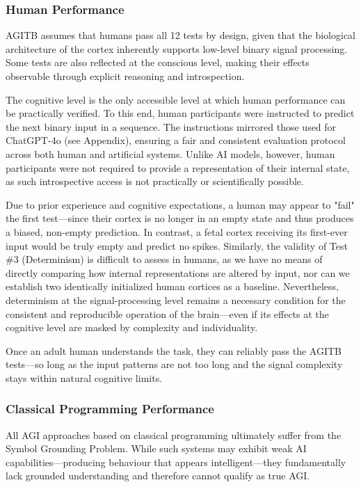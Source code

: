\documentclass{article}
\begin{document}
\subsubsection{Human Performance}

AGITB assumes that humans pass all 12 tests by design, given that the biological architecture of the cortex inherently supports low-level binary signal processing. Some tests are also reflected at the conscious level, making their effects observable through explicit reasoning and introspection.

The cognitive level is the only accessible level at which human performance can be practically verified. To this end, human participants were instructed to predict the next binary input in a sequence. The instructions mirrored those used for ChatGPT-4o (see Appendix), ensuring a fair and consistent evaluation protocol across both human and artificial systems. Unlike AI models, however, human participants were not required to provide a representation of their internal state, as such introspective access is not practically or scientifically possible.

Due to prior experience and cognitive expectations, a human may appear to "fail" the first test—since their cortex is no longer in an empty state and thus produces a biased, non-empty prediction. In contrast, a fetal cortex receiving its first-ever input would be truly empty and predict no spikes. Similarly, the validity of Test \#3 (Determinism) is difficult to assess in humans, as we have no means of directly comparing how internal representations are altered by input, nor can we establish two identically initialized human cortices as a baseline. Nevertheless, determinism at the signal-processing level remains a necessary condition for the consistent and reproducible operation of the brain—even if its effects at the cognitive level are masked by complexity and individuality.

Once an adult human understands the task, they can reliably pass the AGITB tests—so long as the input patterns are not too long and the signal complexity stays within natural cognitive limits.


\subsubsection{Classical Programming Performance}

All AGI approaches based on classical programming ultimately suffer from the Symbol Grounding Problem. While such systems may exhibit weak AI capabilities—producing behaviour that appears intelligent—they fundamentally lack grounded understanding and therefore cannot qualify as true AGI.
\end{document}
